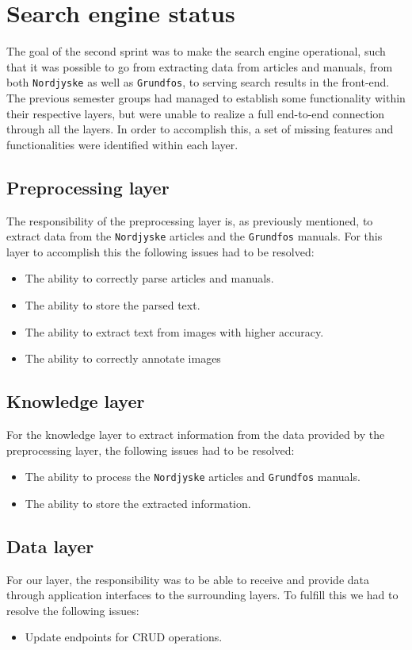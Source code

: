 \section*{Search engine status}
The goal of the second sprint was to make the search engine operational, such that it was possible to go from extracting data from articles and manuals, from both \texttt{Nordjyske} as well as \texttt{Grundfos}, to serving search results in the front-end. The previous semester groups had managed to establish some functionality within their respective layers, but were unable to realize a full end-to-end connection through all the layers. 
In order to accomplish this, a set of missing features and functionalities were identified within each layer.

\subsection*{Preprocessing layer}
The responsibility of the preprocessing layer is, as previously mentioned, to extract data from the \texttt{Nordjyske} articles and the \texttt{Grundfos} manuals. For this layer to accomplish this the following issues had to be resolved:
\begin{itemize}
    \item The ability to correctly parse articles and manuals.
    \item The ability to store the parsed text.
    \item The ability to extract text from images with higher accuracy.
    \item The ability to correctly annotate images 
\end{itemize}

\subsection*{Knowledge layer}
For the knowledge layer to extract information from the data provided by the preprocessing layer, the following issues had to be resolved:
\begin{itemize}
    \item The ability to process the \texttt{Nordjyske} articles and \texttt{Grundfos} manuals.
    \item The ability to store the extracted information.
\end{itemize}

\subsection*{Data layer}
For our layer, the responsibility was to be able to receive and provide data through application interfaces to the surrounding layers. To fulfill this we had to resolve the following issues:
\begin{itemize}
    \item Update endpoints for CRUD operations.
\end{itemize}

